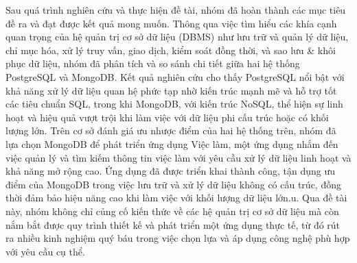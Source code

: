 \indent Sau quá trình nghiên cứu và thực hiện đề tài, nhóm đã hoàn thành các mục tiêu đề ra và đạt được kết quả mong muốn. Thông qua việc tìm hiểu các khía cạnh quan trọng của hệ quản trị cơ sở dữ liệu (DBMS) như lưu trữ và quản lý dữ liệu, chỉ mục hóa, xử lý truy vấn, giao dịch, kiểm soát đồng thời, và sao lưu \& khôi phục dữ liệu, nhóm đã phân tích và so sánh chi tiết giữa hai hệ thống PostgreSQL và MongoDB. Kết quả nghiên cứu cho thấy PostgreSQL nổi bật với khả năng xử lý dữ liệu quan hệ phức tạp nhờ kiến trúc mạnh mẽ và hỗ trợ tốt các tiêu chuẩn SQL, trong khi MongoDB, với kiến trúc NoSQL, thể hiện sự linh hoạt và hiệu quả vượt trội khi làm việc với dữ liệu phi cấu trúc hoặc có khối lượng lớn. Trên cơ sở đánh giá ưu nhược điểm của hai hệ thống trên, nhóm đã lựa chọn MongoDB để phát triển ứng dụng Việc làm, một ứng dụng nhắm đến việc quản lý và tìm kiếm thông tin việc làm với yêu cầu xử lý dữ liệu linh hoạt và khả năng mở rộng cao. Ứng dụng đã được triển khai thành công, tận dụng ưu điểm của MongoDB trong việc lưu trữ và xử lý dữ liệu không có cấu trúc, đồng thời đảm bảo hiệu năng cao khi làm việc với khối lượng dữ liệu lớn.u. Qua đề tài này, nhóm không chỉ củng cố kiến thức về các hệ quản trị cơ sở dữ liệu mà còn nắm bắt được quy trình thiết kế và phát triển một ứng dụng thực tế, từ đó rút ra nhiều kinh nghiệm quý báu trong việc chọn lựa và áp dụng công nghệ phù hợp với yêu cầu cụ thể.